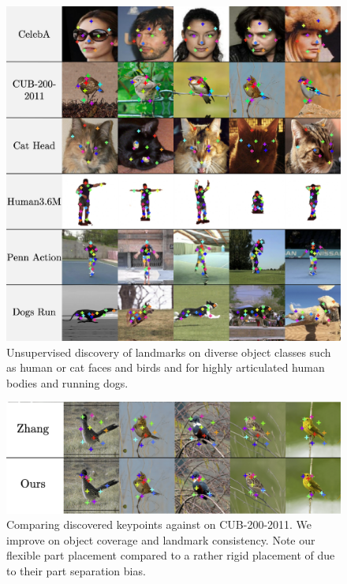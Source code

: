 	\begin{figure}[htp]
		\centering
		\includegraphics[trim={0cm 0cm 0cm 0cm},clip, width=.6\linewidth]{fig/kp_mania}
		\caption{{Unsupervised discovery of landmarks on diverse object classes such as human or cat faces and birds and for highly articulated human bodies and running dogs.}}
		\label{fig:kp_mania}
	\end{figure}
	\begin{figure}[htp]
		\centering
		\includegraphics[trim={0cm 0cm 0cm 0cm},clip, width=.7\linewidth]{fig/birds1x3}
		\caption{Comparing discovered keypoints against \cite{zhang18} on CUB-200-2011. We improve on object coverage and landmark consistency. Note our flexible part placement compared to a rather rigid placement of \cite{zhang18} due to their part separation bias.}
		\label{fig:compare}
	\end{figure}
